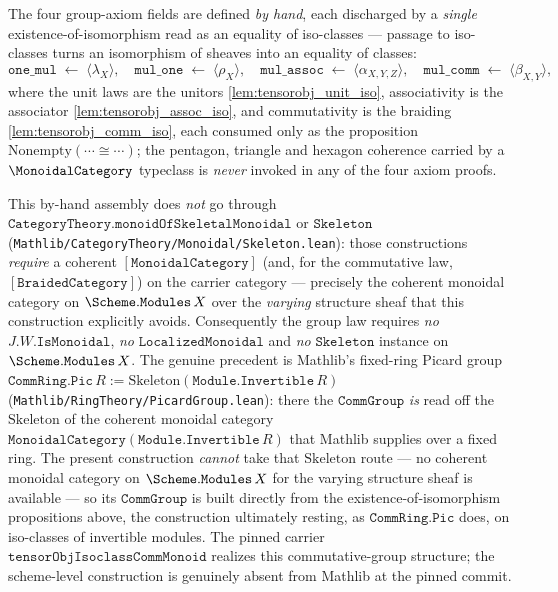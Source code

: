 \begin{lemma}
  The four group-axiom fields are defined \emph{by hand}, each discharged by a
  \emph{single} existence-of-isomorphism read as an equality of iso-classes --- passage
  to iso-classes turns an isomorphism of sheaves into an equality of classes:
  \[
    \mathtt{one\_mul} \;\leftarrow\; \langle \lambda_X \rangle,
    \quad
    \mathtt{mul\_one} \;\leftarrow\; \langle \rho_X \rangle,
    \quad
    \mathtt{mul\_assoc} \;\leftarrow\; \langle \alpha_{X,Y,Z} \rangle,
    \quad
    \mathtt{mul\_comm} \;\leftarrow\; \langle \beta_{X,Y} \rangle,
  \]
  where the unit laws are the unitors \cref{lem:tensorobj_unit_iso}, associativity is
  the associator \cref{lem:tensorobj_assoc_iso}, and commutativity is the braiding
  \cref{lem:tensorobj_comm_iso}, each consumed only as the proposition
  \(\mathrm{Nonempty}(\cdots \cong \cdots)\); the pentagon, triangle and hexagon
  coherence carried by a \(\MonoidalCategory\) typeclass is \emph{never} invoked in
  any of the four axiom proofs.

  This by-hand assembly does \emph{not} go through
  \(\mathtt{CategoryTheory.monoidOfSkeletalMonoidal}\) or \(\mathtt{Skeleton}\)
  (\texttt{Mathlib/CategoryTheory/Monoidal/Skeleton.lean}): those constructions
  \emph{require} a coherent \([\mathtt{MonoidalCategory}]\) (and, for the commutative
  law, \([\mathtt{BraidedCategory}]\)) on the carrier category --- precisely the
  coherent monoidal category on \(\Scheme.\mathtt{Modules}\,X\) over the \emph{varying}
  structure sheaf that this construction explicitly avoids. Consequently the group law
  requires \emph{no} \(J.W.\mathtt{IsMonoidal}\), \emph{no}
  \(\mathtt{LocalizedMonoidal}\) and \emph{no} \(\mathtt{Skeleton}\) instance on
  \(\Scheme.\mathtt{Modules}\,X\). The genuine precedent is Mathlib's fixed-ring
  Picard group \(\mathtt{CommRing.Pic}\,R := \mathrm{Skeleton}(
  \mathtt{Module.Invertible}\,R)\) (\texttt{Mathlib/RingTheory/PicardGroup.lean}):
  there the \(\mathtt{CommGroup}\) \emph{is} read off the \(\mathrm{Skeleton}\) of the
  coherent monoidal category \(\mathtt{MonoidalCategory}(\mathtt{Module.Invertible}\,R)\)
  that Mathlib supplies over a fixed ring. The present construction \emph{cannot} take
  that \(\mathrm{Skeleton}\) route --- no coherent monoidal category on
  \(\Scheme.\mathtt{Modules}\,X\) for the varying structure sheaf is available --- so
  its \(\mathtt{CommGroup}\) is built directly from the existence-of-isomorphism
  propositions above, the construction ultimately resting, as
  \(\mathtt{CommRing.Pic}\) does, on iso-classes of invertible modules. The pinned
  carrier \(\mathtt{tensorObjIsoclassCommMonoid}\) realizes this commutative-group
  structure; the scheme-level construction is genuinely absent from Mathlib at the
  pinned commit.


\end{lemma}
